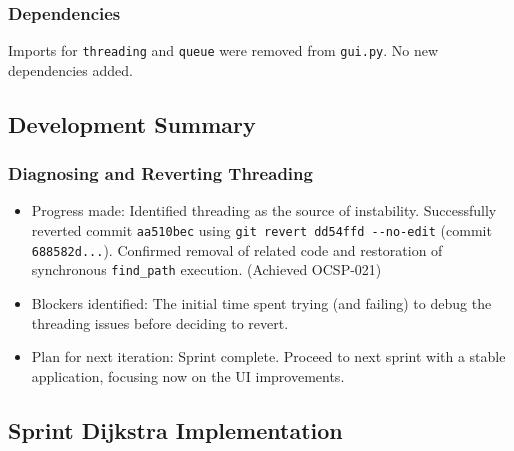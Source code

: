 \subsubsection{Dependencies}
Imports for \verb|threading| and \verb|queue| were removed from \verb|gui.py|. No new dependencies added.

\subsection{Development Summary}

\subsubsection{Diagnosing and Reverting Threading}
\begin{itemize}
	\item Progress made: Identified threading as the source of instability. Successfully reverted commit \verb|aa510bec| using \verb|git revert dd54ffd --no-edit| (commit \verb|688582d...|). Confirmed removal of related code and restoration of synchronous \verb|find_path| execution. (Achieved OCSP-021)
	\item Blockers identified: The initial time spent trying (and failing) to debug the threading issues before deciding to revert.
	\item Plan for next iteration: Sprint complete. Proceed to next sprint with a stable application, focusing now on the UI improvements.
\end{itemize}

\clearpage
\subsection{Sprint Dijkstra Implementation}

